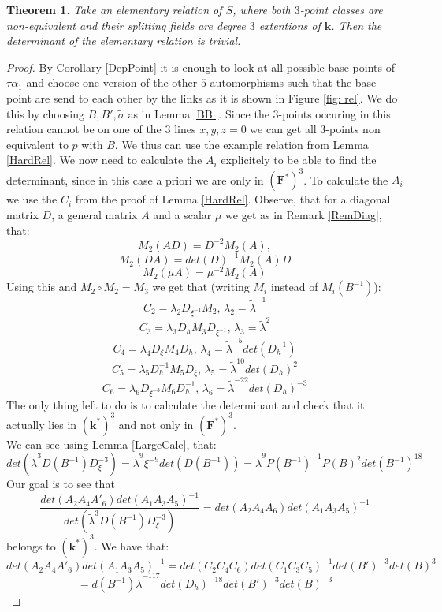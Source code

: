 \documentclass[12pt, oneside, reqno]{amsart}
\newtheorem{theorem}{Theorem}[section]
\begin{document}
\begin{theorem}
    Take an elementary relation of $S$, where both $3$-point classes are non-equivalent and their splitting fields are degree $3$ extentions of $\textbf{k}$. Then the determinant of the elementary relation is trivial. 
\end{theorem}
\begin{proof}
 By Corollary \ref{DepPoint} it is enough to look at all possible base points of $\tau \alpha_1$ and choose one version of the other $5$ automorphisms such that the base point are send to each other by the links as it is shown in Figure \ref{fig: rel}. We do this by choosing $B,B', \tilde \sigma$ as in Lemma \ref{BB'}. Since the $3$-points occuring in this relation cannot be on one of the $3$ lines $x,y,z=0$ we can get all $3$-points non equivalent to $p$ with $B$. We thus can use the example relation from Lemma \ref{HardRel}. We now need to calculate the $A_i$ explicitely to be able to find the determinant, since in this case a priori we are only in $(\textbf{F}^*)^3$. To calculate the $A_i$ we use the $C_i$ from the proof of Lemma \ref{HardRel}. Observe, that for a diagonal matrix $D$, a general matrix $A$ and a scalar $\mu$ we get as in Remark \ref{RemDiag}, that: 
    \[M_2(A D) = D^{-2} M_2(A), \] 
    \[ M_2(DA) = det(D)^{-1} M_2(A) D\] 
    \[M_2(\mu A) = \mu^{-2} M_2(A)\]
    Using this and $M_2 \circ M_2 = M_3$ we get that (writing $M_i$ instead of $M_i(B^{-1})$):
    \[C_2 =  \lambda_2 D_{\xi^{-1}} M_2, \, \lambda_2 = \tilde \lambda^{-1}\]
    \[C_3 =  \lambda_3 D_h M_3 D_{\xi^{-1}}, \, \lambda_3 = \tilde \lambda^2\]
    \[C_4 =  \lambda_4 D_{\xi} M_4 D_h, \, \lambda_4 = \tilde \lambda^{-5} det(D_h^{-1})\]
    \[C_5 = \lambda_5 D_h^{-1} M_5 D_{\xi}, \, \lambda_5 = \tilde \lambda^{10} det(D_h)^2\]
    \[C_6 =   \lambda_6 D_{\xi^{-3}} M_6 D_h^{-1}, \, \lambda_6 =\tilde \lambda^{-22} det(D_h)^{-3}\] 
 The only thing left to do is to calculate the determinant and check that it actually lies in $(\textbf{k}^*)^3$ and not only in $(\textbf{F}^*)^3$. \\
 We can see using Lemma \ref{LargeCalc}, that: \[det(\tilde \lambda^3 D(B^{-1})D_{\xi}^{-3}) = \tilde \lambda^9 \xi^{-9} det(D(B^{-1})) = \tilde \lambda^9 P(B^{-1})^{-1} P(B)^2 det(B^{-1})^{18}\] Our goal is to see that \[ \frac{det(A_2A_4A'_6)det(A_1A_3A_5)^{-1}} {det(\tilde \lambda^{3}D(B^{-1}) D_{\xi}^{-3})} = det(A_2A_4A_6)det(A_1A_3A_5)^{-1}\]
 belongs to $(\textbf{k}^*)^3$. We have that:
 \[det(A_2A_4A'_6)det(A_1A_3A_5)^{-1} = det(C_2C_4C_6)det(C_1C_3C_5)^{-1} det(B')^{-3}det(B)^3 \] \[= d(B^{-1}) \tilde \lambda^{-117} det(D_h)^{-18}det(B')^{-3}det(B)^{-3}\]

\end{proof}
\end{document}
